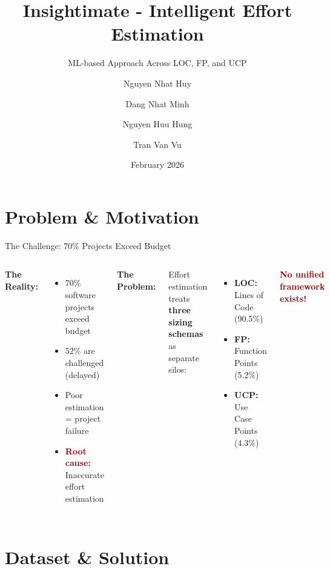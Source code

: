 \documentclass[aspectratio=169]{beamer}
\title[Insightimate]{Insightimate - Intelligent Effort Estimation}
\subtitle{ML-based Approach Across LOC, FP, and UCP}
\author[Huy, Minh, Hung, Vu]{\small Nguyen Nhat Huy \and Dang Nhat Minh \and Nguyen Huu Hung \and Tran Van Vu}
\institute[PTIT]{\small Posts and Telecommunications Institute of Technology}
\date{February 2026}
\begin{document}
\begin{frame}
\titlepage
\end{frame}

\section{Problem \& Motivation}

\begin{frame}{The Challenge: 70\% Projects Exceed Budget}
\begin{columns}[T]
\textbf{The Reality:}
\begin{itemize}
    \item 70\% software projects exceed budget
    \item 52\% are challenged (delayed)
    \item Poor estimation = project failure
    \item \textcolor{darkred}{\textbf{Root cause:}} Inaccurate effort estimation
\end{itemize}

\textbf{The Problem:}

\vspace{0.5cm}
Effort estimation treats \textbf{three sizing schemas} as separate silos:
\begin{itemize}
    \item \textbf{LOC:} Lines of Code (90.5\%)
    \item \textbf{FP:} Function Points (5.2\%)
    \item \textbf{UCP:} Use Case Points (4.3\%)
\end{itemize}

\vspace{0.5cm}
\textcolor{darkred}{\textbf{No unified framework exists!}}
\end{columns}
\end{frame}

\section{Dataset \& Solution}
\end{document}
